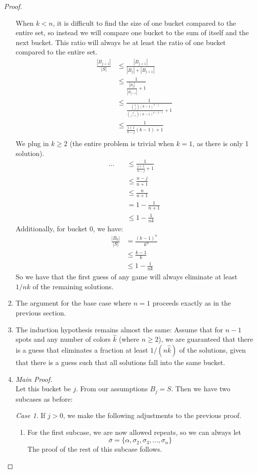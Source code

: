 \documentclass[12pt, a4paper]{article}
\begin{document}
\begin{proof}
\begin{enumerate}
		When $k<n$, it is difficult to find the size of one bucket compared to the
		entire set, so instead we will compare one bucket to the sum of itself
		and the next bucket. This ratio will always be at least the ratio of
		one bucket compared to the entire set.
			\begin{align*}
			\frac{|B_{j+1}|}{|S|}
			& \le \frac{|B_{j+1}|}{|B_j|+|B_{j+1}|}\\
			& \le \frac{1}{\frac{|B_j|}{|B_{j+1}|}+1}\\
			& \le \frac{1}{\frac{\binom{n}{j}(k-1)^{n-j}}
			{\binom{n}{j+1}(k-1)^{n-j-1}}+1}\\
			& \le \frac{1}{\frac{j+1}{n-j}(k-1)+1}\\
			\end{align*}
			We plug in $k \ge 2$ (the entire problem is trivial when $k = 1$, as
			there is only 1 solution).
			\begin{align*}
			\ldots\quad & \le \frac{1}{\frac{j+1}{n-j}+1}\\
			& \le \frac{n-j}{n+1}\\
			& \le \frac{n}{n+1}\\
			& = 1-\frac{1}{n+1}\\
			& \le 1-\frac{1}{nk}
			\end{align*}
		Additionally, for bucket 0, we have:
		\begin{align*}
			\frac{|B_{0}|}{|S|}
			& = \frac{(k-1)^n}{k^n}\\
			& \le \frac{k-1}{k}\\
			& \le 1-\frac{1}{nk}
		\end{align*}
		So we have that the first guess of any game will always eliminate at least
		$1/nk$ of the remaining solutions.
		\item The argument for the base case where $n=1$ proceeds exactly as in the
		previous section.
		\item The induction hypothesis remains almost the same: Assume that for $n-1$
		spots and any number
		of colors $\widehat{k}$ (where $n\ge 2$), we are guaranteed that
		there is a guess that eliminates a fraction at least $1/(n\widehat{k})$
		of the solutions, given that there is a guess such that all solutions fall into
		the same bucket.

		\item\textit{Main Proof.}\\
		Let this bucket be $j$. From our assumptions $B_j = S$. Then we have two
		subcases as before: 

		\textit{Case 1.} If $j>0$, we make the following adjustments to the previous
		proof.
		\begin{enumerate}[label=\roman*.]
		\item For the first subcase, we are now allowed repeats, so we
		can always let
			\begin{equation*}
			\overline{\sigma}=\{\alpha, \sigma_2, \sigma_3, \ldots, \sigma_n\}
			\end{equation*}
		The proof of the rest of this subcase follows.
		

\end{enumerate}
\end{enumerate}
\end{proof}
\end{document}

